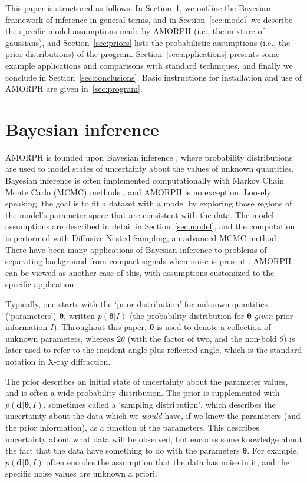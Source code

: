 \documentclass[review]{elsarticle}
\newcommand{\params}{\boldsymbol{\theta}}
\newcommand{\data}{\boldsymbol{d}}
\newcommand{\info}{I}
\begin{document}
This paper is structured as follows. In Section~\ref{sec:bayes}, we outline the Bayesian
framework of inference in general terms, and in Section~\ref{sec:model} we describe the
specific model assumptions made by AMORPH (i.e., the mixture of gaussians), and
Section~\ref{sec:priors} lists the probabilistic assumptions (i.e., the prior distributions) of the program. Section~\ref{sec:applications} presents some
example applications and comparisons with standard techniques, and finally we conclude
in Section~\ref{sec:conclusions}. Basic instructions for installation and use of AMORPH are given in~\ref{sec:program}.

\section{Bayesian inference}\label{sec:bayes}
AMORPH is founded upon Bayesian inference
\citep{gregory2005bayesian, o2004kendall, sivia2006data}, where
probability distributions are used to model
states of uncertainty about the values of unknown quantities.
Bayesian inference is often implemented computationally with
Markov Chain Monte Carlo (MCMC) methods \citep{mackay2003}, and AMORPH is no exception.
Loosely speaking, the goal is to fit a dataset with a model by exploring
those regions of the model's parameter space that are consistent with the
data. The model assumptions are described in detail in
Section~\ref{sec:model}, and the computation is performed with
Diffusive Nested Sampling, an advanced MCMC method \citep{dns, dnest4}.
There have been many applications of Bayesian inference to
problems of separating background from compact signals
when noise is present \citep[e.g.][]{}. AMORPH can be viewed as another
case of this, with assumptions customized to the specific application.

Typically, one starts with the `prior distribution'
for unknown quantities (`parameters') $\params$, written $p(\params | \info)$
(the probability distribution for $\params$ {\em given} prior information
$\info$). Throughout this paper, $\params$ is used to denote a
collection of unknown parameters, whereas $2\theta$ (with the factor of two, and the
non-bold $\theta$) is later used to
refer to the incident angle plus reflected angle, which is the
standard notation in X-ray diffraction. 

The prior describes an initial state of uncertainty about the
parameter values, and is often a wide probability distribution.
The prior is supplemented with $p(\data | \params, \info)$, sometimes
called a `sampling distribution',
which describes the uncertainty about the data which we {\em would} have,
if we knew the parameters (and the prior information), as a function of
the parameters. This describes uncertainty about what data will be observed,
but encodes some knowledge about the fact that the data have something to do with the
parameters $\params$. For example, $p(\data | \params, \info)$ often encodes
the assumption that the data has noise in it, and the specific noise values
are unknown a priori.
\end{document}
